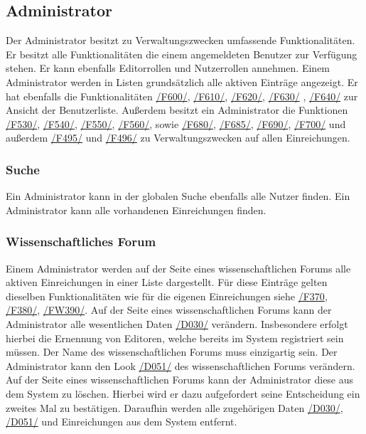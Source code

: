 \subsection{Administrator}
Der Administrator besitzt zu Verwaltungszwecken umfassende Funktionalitäten. Er besitzt alle Funktionalitäten die
einem angemeldeten Benutzer zur Verfügung stehen. Er kann ebenfalls Editorrollen und Nutzerrollen annehmen.
Einem Administrator werden in Listen grundsätzlich alle aktiven Einträge angezeigt. Er hat ebenfalls die Funktionalitäten
\hyperref[funkt:600]{/F600/}, \hyperref[funkt:610]{/F610/}, \hyperref[funkt:620]{/F620/}, \hyperref[funkt:630]{/F630/}
, \hyperref[funkt:640]{/F640/} zur Ansicht der Benutzerliste.
Außerdem besitzt ein Administrator die Funktionen \hyperref[funkt:530]{/F530/}, \hyperref[funkt:540]{/F540/},
\hyperref[funkt:550]{/F550/}, \hyperref[funkt:560]{/F560/}, sowie \hyperref[funkt:680]{/F680/}, \hyperref[funkt:685]{/F685/},
\hyperref[funkt:690]{/F690/}, \hyperref[funkt:700]{/F700/} und außerdem
\hyperref[funkt:495]{/F495/} und \hyperref[funkt:496]{/F496/}
zu Verwaltungszwecken auf allen Einreichungen.

\subsubsection{Suche}
\begin{description}
     Ein Administrator kann in der globalen Suche ebenfalls alle Nutzer finden.
     Ein Administrator kann alle vorhandenen Einreichungen finden.
\end{description}

\subsubsection{Wissenschaftliches Forum}
\begin{description}
     Einem Administrator werden auf der Seite eines wissenschaftlichen Forums
    alle aktiven Einreichungen in einer Liste dargestellt.
    Für diese Einträge gelten dieselben Funktionalitäten wie für die
    eigenen Einreichungen siehe \hyperref[funkt:370]{/F370}, \hyperref[funkt:380]{/F380/}, \hyperref[funkt:390]{/FW390/}.
     Auf der Seite eines wissenschaftlichen Forums kann der Administrator alle wesentlichen Daten \hyperref[d030]{/D030/}
    verändern. Insbesondere erfolgt hierbei die Ernennung von Editoren, welche bereits im System
    registriert sein  müssen. Der Name des wissenschaftlichen Forums muss einzigartig sein.
     Der Administrator kann den Look \hyperref[d051]{/D051/}
    des wissenschaftlichen Forums verändern.
     Auf der Seite eines wissenschaftlichen Forums kann der Administrator diese aus dem System zu löschen.
    Hierbei wird er dazu aufgefordert seine Entscheidung ein zweites Mal zu bestätigen.
    Daraufhin werden alle zugehörigen Daten \hyperref[d030]{/D030/}, \hyperref[d051]{/D051/}
    und Einreichungen aus dem System entfernt.
\end{description}

